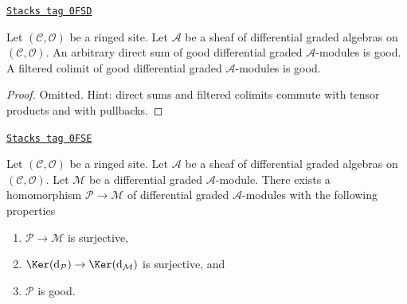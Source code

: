 \begin{lemma}
\label{sdga-lemma-good-direct-sum}
\href{https://stacks.math.columbia.edu/tag/0FSD}{\texttt{Stacks tag 0FSD}}

Let $(\mathcal{C}, \mathcal{O})$ be a ringed site.
Let $\mathcal{A}$ be a sheaf of differential graded algebras
on $(\mathcal{C}, \mathcal{O})$. An arbitrary
direct sum of good differential graded $\mathcal{A}$-modules
is good. A filtered colimit of good differential graded
$\mathcal{A}$-modules is good.
\end{lemma}

\begin{proof}
Omitted. Hint: direct sums and filtered colimits
commute with tensor products and with pullbacks.
\end{proof}

\begin{lemma}
\label{sdga-lemma-good-quotient}
\href{https://stacks.math.columbia.edu/tag/0FSE}{\texttt{Stacks tag 0FSE}}

Let $(\mathcal{C}, \mathcal{O})$ be a ringed site.
Let $\mathcal{A}$ be a sheaf of differential graded algebras
on $(\mathcal{C}, \mathcal{O})$. Let $\mathcal{M}$
be a differential graded $\mathcal{A}$-module. There exists a homomorphism
$\mathcal{P} \to \mathcal{M}$ of differential graded $\mathcal{A}$-modules
with the following properties
\begin{enumerate}
\item $\mathcal{P} \to \mathcal{M}$ is surjective,
\item $\Ker(\text{d}_\mathcal{P}) \to \Ker(\text{d}_\mathcal{M})$
is surjective, and
\item $\mathcal{P}$ is good.
\end{enumerate}
\end{lemma}


